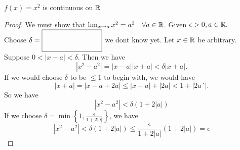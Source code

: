 \pagebreak

\begin{thm}
	$f(x)=x^2$ is continuous on $\mathbb{R}$
\end{thm}
\begin{proof}
	We must show that $\lim_{x \to a} x^2 = a^2 \quad \forall a\in \mathbb{R}$. Given $\epsilon >0, a\in \mathbb{R}.$ \\
	Choose $\delta = \boxed{\color{white}\min \left\{1, \frac{\epsilon}{1+2|a|}\right\}}$ we dont know yet. Let $x\in \mathbb{R}$ be arbitrary. Suppose $0<|x-a|<\delta$. Then we have 
	\begin{dmath}
		|x^2-a^2|=|x-a||x+a|<\delta|x+a|. 
	\end{dmath}
	If we would choose $\delta$ to be $\leq 1$ to begin with, we would have \begin{dmath}
		|x+a| = |x-a+2a| \leq |x-a| + |2a| < 1 + |2a´|.
	\end{dmath} So we have
	\begin{equation}
		|x^2-a^2| < \delta (1+2|a|)
	\end{equation} 
	If we choose $\delta = \boxed{\min \left\{1, \frac{\epsilon}{1+2|a|}\right\}}$, we have
	\begin{dmath}
		|x^2-a^2| < \delta (1+2|a|) \leq \frac{\epsilon}{1+2|a|} (1+2|a|) = \epsilon
	\end{dmath}
\end{proof}